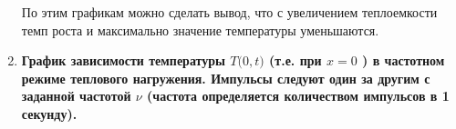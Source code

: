 \begin{enumerate}
        По этим графикам можно сделать вывод, что с увеличением теплоемкости темп роста и максимально значение температуры уменьшаются.

    \item \textbf{График зависимости температуры $T\big( 0, t \big)$ (т.е. при $x = 0$ ) в частотном режиме теплового нагружения. Импульсы следуют один за другим с заданной частотой $\nu$ (частота определяется количеством импульсов в 1 секунду).}
\end{enumerate}
